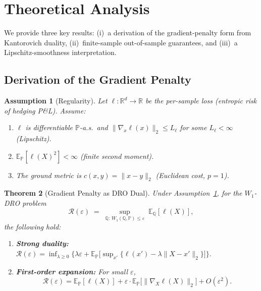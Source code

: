 \documentclass[11pt]{article}
\newtheorem{theorem}{Theorem}[section]
\newtheorem{assumption}[theorem]{Assumption}
\newcommand{\E}{\mathbb{E}}
\newcommand{\R}{\mathbb{R}}
\newcommand{\PP}{\mathbb{P}}
\newcommand{\QQ}{\mathbb{Q}}
\begin{document}
\section{Theoretical Analysis}
\label{sec:theory}

We provide three key results: (i)~a derivation of the gradient-penalty form from Kantorovich duality, (ii)~finite-sample out-of-sample guarantees, and (iii)~a Lipschitz-smoothness interpretation.

\subsection{Derivation of the Gradient Penalty}

\begin{assumption}[Regularity]
\label{ass:regularity}
Let $\ell:\R^d\to\R$ be the per-sample loss (entropic risk of hedging P\&L).  Assume:
\begin{enumerate}[noitemsep,label=(\roman*)]
    \item $\ell$ is differentiable $\PP$-a.s.\ and $\|\nabla_x\ell(x)\|_2 \le L_\ell$ for some $L_\ell < \infty$ (Lipschitz).
    \item $\E_\PP[\ell(X)^2] < \infty$ (finite second moment).
    \item The ground metric is $c(x,y) = \|x-y\|_2$ (Euclidean cost, $p=1$).
\end{enumerate}
\end{assumption}

\begin{theorem}[Gradient Penalty as DRO Dual]
\label{thm:grad_penalty}
Under Assumption~\ref{ass:regularity}, for the $W_1$-DRO problem
\[
    \mathcal{R}(\varepsilon) \;=\; \sup_{\QQ:\,W_1(\QQ,\PP)\le\varepsilon}\;\E_\QQ[\ell(X)],
\]
the following hold:
\begin{enumerate}[noitemsep,label=(\alph*)]
    \item \textbf{Strong duality:}
    $\displaystyle \mathcal{R}(\varepsilon) = \inf_{\lambda\ge 0}\bigl\{\lambda\varepsilon + \E_\PP\bigl[\sup_{x'}\{\ell(x') - \lambda\|X-x'\|_2\}\bigr]\bigr\}.$
    \item \textbf{First-order expansion:} For small $\varepsilon$,
    \begin{equation}
        \mathcal{R}(\varepsilon) = \E_\PP[\ell(X)] + \varepsilon\cdot\E_\PP\bigl[\|\nabla_X\ell(X)\|_2\bigr] + O(\varepsilon^2).
        \label{eq:first_order}
    \end{equation}
\end{enumerate}
\end{theorem}
\end{document}
